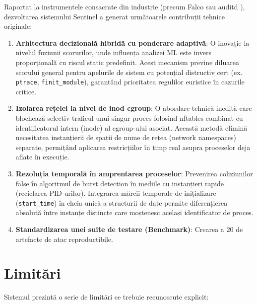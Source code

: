 \par Raportat la instrumentele consacrate din industrie (precum Falco \cite{FalcoProject} sau auditd \cite{LinuxAudit}), dezvoltarea sistemului Sentinel a generat următoarele contribuții tehnice originale:

\begin{enumerate}
    \item \textbf{Arhitectura decizională hibridă cu ponderare adaptivă}: O inovație la nivelul fuziunii scorurilor, unde influența analizei ML este invers proporțională cu riscul static predefinit. Acest mecanism previne diluarea scorului general pentru apelurile de sistem cu potențial distructiv cert (ex. \texttt{ptrace}, \texttt{finit\_module}), garantând prioritatea regulilor euristice în cazurile critice.
    \item \textbf{Izolarea rețelei la nivel de inod cgroup}: O abordare tehnică inedită care blochează selectiv traficul unui singur proces folosind nftables combinat cu identificatorul intern (inode) al cgroup-ului asociat. Această metodă elimină necesitatea instanțierii de spații de nume de rețea (network namespaces) separate, permițând aplicarea restricțiilor în timp real asupra proceselor deja aflate în execuție.
    \item \textbf{Rezoluția temporală în amprentarea proceselor}: Prevenirea coliziunilor false în algoritmul de burst detection în mediile cu instanțieri rapide (reciclarea PID-urilor). Integrarea mărcii temporale de inițializare (\texttt{start\_time}) în cheia unică a structurii de date permite diferențierea absolută între instanțe distincte care moștenesc același identificator de proces.
    \item \textbf{Standardizarea unei suite de testare (Benchmark)}: Crearea a 20 de artefacte de atac reproductibile.
\end{enumerate}


\section*{Limitări}

\par Sistemul prezintă o serie de limitări ce trebuie recunoscute explicit:

